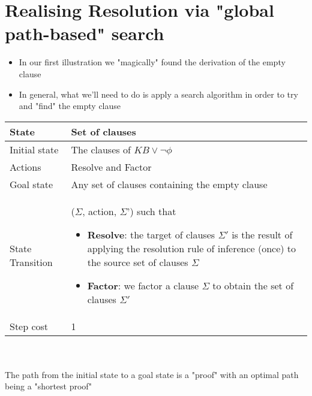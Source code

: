 \documentclass{article}[18pt]
\begin{document}
\section{Realising Resolution via "global path-based" search}
\begin{itemize}
	\item In our first illustration we "magically" found the derivation of the empty clause
	\item In general, what we'll need to do is apply a search algorithm in order to try and "find" the empty clause
\end{itemize}
{\renewcommand{\arraystretch}{2}
\begin{tabularx}{\textwidth}{|X|X|}
\hline
State & Set of clauses\\
\hline
Initial state & The clauses of $KB \lor \lnot \phi$\\
\hline
Actions & Resolve and Factor\\
\hline
Goal state & Any set of clauses containing the empty clause\\
\hline
State Transition & 
($\Sigma$, action, $\Sigma$') such that
\begin{itemize}
	\item \textbf{Resolve}: the target of clauses $\Sigma'$ is the result of applying the resolution rule of inference (once) to the source set of clauses $\Sigma$
	\item \textbf{Factor}: we factor a clause $\Sigma$ to obtain the set of clauses $\Sigma'$
\end{itemize}
\\
\hline
Step cost & 1\\
\hline

\end{tabularx}}\\
\\
The path from the initial state to a goal state is a "proof" with an optimal path being a "shortest proof"
\end{document}
